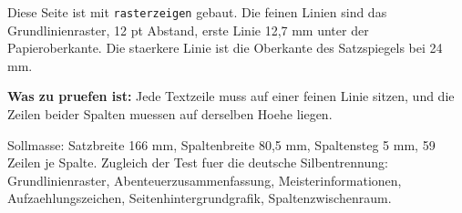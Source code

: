 \documentclass[raster,rasterzeigen]{dsa5latex}
\begin{document}

\begin{dsaImpressumseite}



\end{dsaImpressumseite}

\dsaInhalt


Diese Seite ist mit \verb|rasterzeigen| gebaut. Die feinen Linien sind das
Grundlinienraster, 12 pt Abstand, erste Linie 12,7 mm unter der
Papieroberkante. Die staerkere Linie ist die Oberkante des Satzspiegels bei
24 mm.

\textbf{Was zu pruefen ist:} Jede Textzeile muss auf einer feinen Linie
sitzen, und die Zeilen beider Spalten muessen auf derselben Hoehe liegen.

Sollmasse: Satzbreite 166 mm, Spaltenbreite 80,5 mm, Spaltensteg 5 mm, 59
Zeilen je Spalte. Zugleich der Test fuer die deutsche Silbentrennung:
Grundlinienraster, Abenteuerzusammenfassung, Meisterinformationen,
Aufzaehlungszeichen, Seitenhintergrundgrafik, Spaltenzwischenraum.

\end{document}
